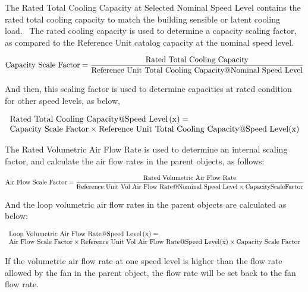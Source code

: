 The Rated Total Cooling Capacity at Selected Nominal Speed Level contains the rated total cooling capacity to match the building sensible or latent cooling load.~ The rated cooling capacity is used to determine a capacity scaling factor, as compared to the Reference Unit catalog capacity at the nominal speed level.

\begin{equation}
{\rm{Capacity~Scale~Factor}} = \frac{{{\rm{Rated~Total~Cooling~Capacity}}}}{{{\rm{Reference~Unit~Total~Cooling~Capacity}}@{\rm{Nominal~Speed~Level}}}}
\end{equation}

And then, this scaling factor is used to determine capacities at rated condition for other speed levels, as below,

\begin{equation}
\begin{array}{l}
{\rm{Rated~Total~Cooling~Capacity}}@{\rm{Speed~Level}}\left( {\rm{x}} \right) = \\
{\rm{Capacity~Scale~Factor}} \times {\rm{Reference~Unit~Total~Cooling~Capacity}}@{\rm{Speed~Level}}({\rm{x}})
\end{array}
\end{equation}

The Rated Volumetric Air Flow Rate is used to determine an internal scaling factor, and calculate the air flow rates in the parent objects, as follows:

\begin{equation}
{\rm{Air~Flow~Scale~Factor}} = \frac{{{\rm{Rated~Volumetric~Air~Flow~Rate}}}}{{{\rm{Reference~Unit~Vol~Air~Flow~Rate}}@{\rm{Nominal~Speed~Level}} \times {\rm{CapacityScaleFactor}}}}
\end{equation}

And the loop volumetric air flow rates in the parent objects are calculated as below:

\begin{equation}
\begin{array}{l}
{\rm{Loop~Volumetric~Air~Flow~Rate}}@{\rm{Speed~Level}}\left( {\rm{x}} \right) = \\ {\rm{Air~Flow~Scale~Factor}} \times {\rm{Reference~Unit~Vol~Air~Flow~Rate}}@{\rm{Speed~Level}}({\rm{x}}) \times {\rm{Capacity~Scale~Factor}}
\end{array}
\end{equation}

If the volumetric air flow rate at one speed level is higher than the flow rate allowed by the fan in the parent object, the flow rate will be set back to the fan flow rate.


